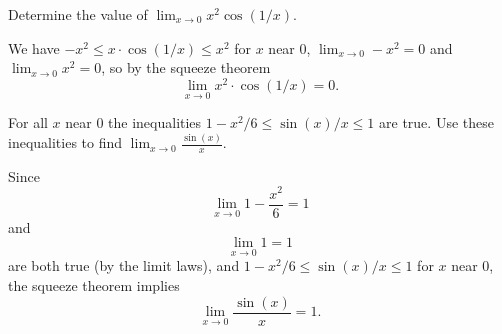 \documentclass[nooutcomes, handout]{ximera}
\begin{document}
\begin{problem}


  Determine the value of $\displaystyle\lim_{x \to 0} x^2 \cos(1/x)$.
  \begin{freeResponse}
    We have $-x^2 \le x \cdot \cos(1/x) \le x^2$ for $x$ near 0, $\lim_{x \to 0} -x^2 = 0$ and $\lim_{x \to 0} x^2 = 0$, so by the squeeze theorem
    \[
      \lim_{x \to 0} x^2 \cdot \cos(1/x) = 0.
    \]
  \end{freeResponse}

\end{problem}
	
	
	
	
	
	
\begin{problem}
 For all $x$ near 0 the inequalities $1 - x^2/6 \le \sin(x)/x \le 1$ are true.
  Use these inequalities to find $\displaystyle\lim_{x \to 0} \frac{\sin(x)}{x}$.
  \begin{freeResponse}
    Since
    \[
      \lim_{x \to 0} 1 - \frac{x^2}{6} = 1
    \]
    and
    \[
     \lim_{x \to 0} 1 = 1
    \]
    are both true (by the limit laws), and $1 - x^2/6 \le \sin(x)/x \le 1$ for $x$ near 0, the squeeze theorem implies
    \[
     \lim_{x \to 0} \frac{\sin(x)}{x} = 1.
    \]


  \end{freeResponse}



\end{problem}
	
\end{document}
